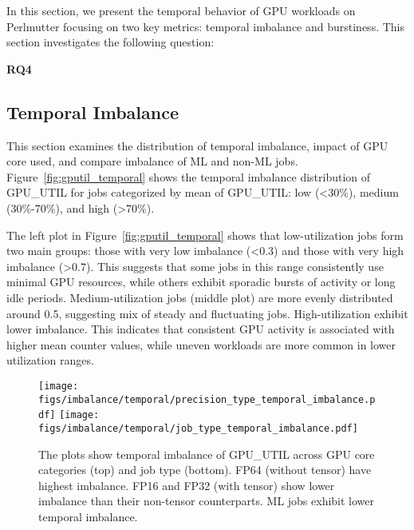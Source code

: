 In this section, we present the temporal behavior of GPU workloads on
Perlmutter focusing on two key metrics: temporal imbalance and burstiness. This
section investigates the following question:
%
\begin{RQcallout}
    {\bf RQ4 }{\it \RQfour{}}
\end{RQcallout}

\subsection{Temporal Imbalance}
\label{sub:temporal-imbalance}

This section examines the distribution of temporal imbalance, impact
of GPU core used, and compare imbalance of ML and non-ML jobs.
Figure~\ref{fig:gputil_temporal} shows the temporal imbalance distribution
of GPU\_UTIL for jobs categorized by mean of GPU\_UTIL: low
(\textless30\%), medium (30\%-70\%), and high (\textgreater70\%).

The left plot in Figure~\ref{fig:gputil_temporal} shows that low-utilization jobs
form two main groups: those with very low imbalance (\textless0.3) and those with
very high imbalance (\textgreater0.7). This suggests that some jobs in this range
consistently use minimal GPU resources, while others exhibit sporadic bursts of
activity or long idle periods. Medium-utilization jobs (middle plot) are more evenly
distributed around 0.5, suggesting mix of steady and fluctuating jobs. High-utilization
exhibit lower imbalance. This indicates that consistent GPU activity is
associated with higher mean counter values, while uneven workloads are more common in
lower utilization ranges.

\begin{figure}[h]
    \centering
    \texttt{[image: figs/imbalance/temporal/precision\_type\_temporal\_imbalance.pdf]}
    \texttt{[image: figs/imbalance/temporal/job\_type\_temporal\_imbalance.pdf]}
    \caption{The plots show temporal imbalance of GPU\_UTIL
        across GPU core categories (top) and job type (bottom).
        FP64 (without tensor) have highest imbalance. FP16 and
        FP32 (with tensor) show lower imbalance than their non-tensor
        counterparts. ML jobs exhibit lower temporal imbalance.}
    \label{fig:imbalance_type}
\end{figure}

